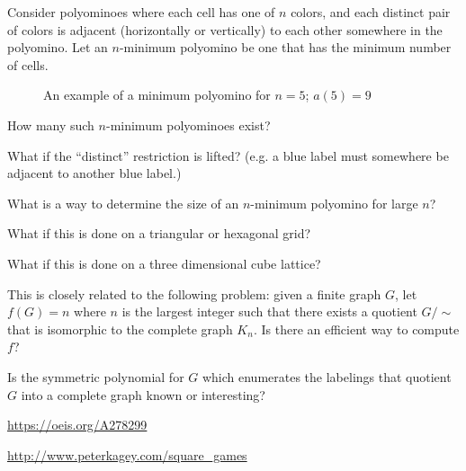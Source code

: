 \documentclass{article}
\begin{document}
Consider polyominoes where each cell has one of $n$ colors, and
each distinct pair of colors is adjacent (horizontally or vertically) to each other
somewhere in the polyomino. Let an $n$-minimum polyomino be one that has the
minimum number of cells.

\begin{figure}[!h]
  \centering
  \caption{An example of a minimum polyomino for $n = 5$; $a(5)=9$}
\end{figure}

\begin{question}
  How many such $n$-minimum polyominoes exist?
\end{question}
\begin{related}
  \item What if the ``distinct'' restriction is lifted?
    (e.g. a blue label must somewhere be adjacent to another blue label.)
  \item What is a way to determine the size of an $n$-minimum polyomino for
    large $n$?
  \item What if this is done on a triangular or hexagonal grid?
  \item What if this is done on a three dimensional cube lattice?
\end{related}

\begin{note}
  This is closely related to the following problem: given a finite graph $G$,
  let $f(G) = n$ where $n$ is the largest integer such that there exists a
  quotient $G/\sim$ that is isomorphic to the complete graph $K_n$. Is there
  an efficient way to compute $f$?

  Is the symmetric polynomial for $G$ which enumerates the labelings that
  quotient $G$ into a complete graph known or interesting?
\end{note}

\begin{references}
  \item \url{https://oeis.org/A278299}
  \item \url{http://www.peterkagey.com/square_games}
\end{references}
\end{document}
